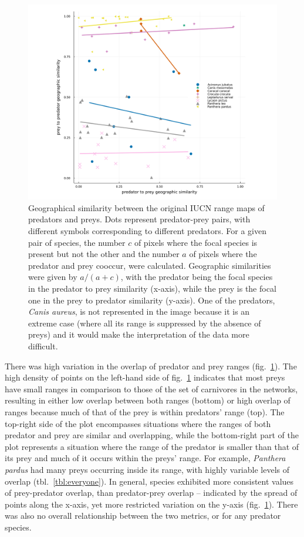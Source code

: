 \documentclass[10pt,oneside]{article}
\makeatletter
\def\maxwidth{\ifdim\Gin@nat@width>\linewidth\linewidth
\else\Gin@nat@width\fi}
\let\Oldincludegraphics\includegraphics
\renewcommand{\includegraphics}[1]{\Oldincludegraphics[width=\maxwidth]{#1}}
\makeatother
\begin{document}
\begin{figure}
\hypertarget{fig:geo_diss}{%
\centering
\includegraphics{figures/beta-div_pred-species.png}
\caption{Geographical similarity between the original IUCN range maps of
predators and preys. Dots represent predator-prey pairs, with different
symbols corresponding to different predators. For a given pair of
species, the number \(c\) of pixels where the focal species is present
but not the other and the number \(a\) of pixels where the predator and
prey cooccur, were calculated. Geographic similarities were given by
\(a/(a+c)\), with the predator being the focal species in the predator
to prey similarity (x-axis), while the prey is the focal one in the prey
to predator similarity (y-axis). One of the predators, \emph{Canis
aureus}, is not represented in the image because it is an extreme case
(where all its range is suppressed by the absence of preys) and it would
make the interpretation of the data more difficult.}\label{fig:geo_diss}
}
\end{figure}

There was high variation in the overlap of predator and prey ranges
(fig.~\ref{fig:geo_diss}). The high density of points on the left-hand
side of fig.~\ref{fig:geo_diss} indicates that most preys have small
ranges in comparison to those of the set of carnivores in the networks,
resulting in either low overlap between both ranges (bottom) or high
overlap of ranges because much of that of the prey is within predators'
range (top). The top-right side of the plot encompasses situations where
the ranges of both predator and prey are similar and overlapping, while
the bottom-right part of the plot represents a situation where the range
of the predator is smaller than that of its prey and much of it occurs
within the preys' range. For example, \emph{Panthera pardus} had many
preys occurring inside its range, with highly variable levels of overlap
(tbl.~\ref{tbl:everyone}). In general, species exhibited more consistent
values of prey-predator overlap, than predator-prey overlap -- indicated
by the spread of points along the x-axis, yet more restricted variation
on the y-axis (fig.~\ref{fig:geo_diss}). There was also no overall
relationship between the two metrics, or for any predator species.
\end{document}
